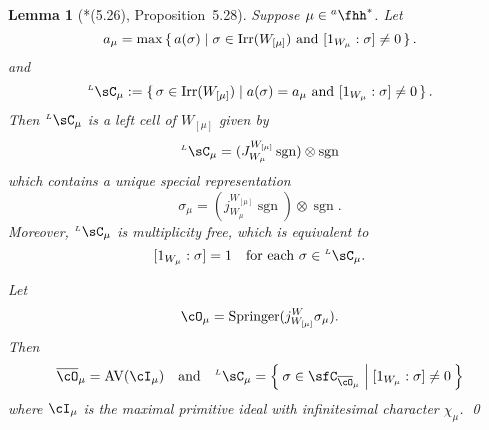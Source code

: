 \documentclass[12pt,a4paper]{amsart}
\newcommand{\AV}{\mathrm{AV}}
\newcommand{\sgn}{\operatorname{sgn}}
\numberwithin{equation}{section}
\newtheorem{lem}[thm]{Lemma}
\theoremstyle{remark}
\def\Irr{\mathrm{Irr}}
\def\lamck{\lambda_\ckcO}
\def\hha{{}^a\fhh}
\def\ahh{\hha}
\def\WLamck{W_{[\lambda_{\ckcO}]}}
\def\Wlamck{W_{\lamck}}
\def\LC{{}^{\scriptscriptstyle L}\sC}
\def\AND{\quad \text{and} \quad}
\def\Spr{\mathrm{Springer}}
\begin{document}
\begin{lem}[{\cite{BVUni}*{(5.26), Proposition~5.28}}]
  \label{lem:LC.mu}
  \label{lem:lcell.BV}
  Suppose $\mu\in \ahh^{*}$. Let
  \[
    a_{\mu} = \max\set{a(\sigma)| \sigma \in \Irr(W_{[\mu]}) \text{ and
      } [1_{W_{\mu}}: \sigma]\neq 0}.
  \]
  and
  \[
    \LC_{\mu} := \set{\sigma \in \Irr(W_{[\mu]}) | a(\sigma) = a_{\mu} \text{
        and } [1_{W_{\mu}}: \sigma]\neq 0 }.
  \]
  Then
  $\LC_{\mu}$ is a left cell of $W_{[\mu]}$ given by
  \begin{equation}\label{eq:LC.mu}
    \LC_{\mu}=(J_{W_{\mu}}^{W_{[\mu]}} \sgn )\otimes \sgn
  \end{equation}
  which contains a unique special representation
  \[
    \sigma_{\mu}=(j_{W_{\mu}}^{W_{[\mu]}} \sgn )\otimes \sgn.
  \]
  Moreover, $\LC_{\mu}$ is multiplicity free, which is equivalent to
  \[
    [1_{W_{\mu}}:\sigma]=1 \quad \text{for each } \sigma\in \LC_{\mu}.
  \]

  Let
  \begin{equation}\label{eq:O.mu}
    \cO_{\mu} = \Spr(j_{W_{[\mu]}}^{W}\sigma_{\mu}).
  \end{equation}
  Then
  \[
    \bcO_{\mu} = \AV(\cI_{\mu}) \AND \LC_{\mu} = \Set{\sigma\in \sfC_{\bcO_{\mu}}| [1_{W_{\mu}}:\sigma]\neq 0}
  \]
  where $\cI_{\mu}$ is the maximal primitive ideal with infinitesimal character
  $\chi_{\mu}$. \qed
\end{lem}
\end{document}
